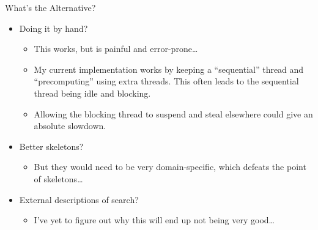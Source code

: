 \documentclass{beamer}
\begin{document}
\begin{frame}{What's the Alternative?}

    \begin{itemize}
        \item <2-> Doing it by hand?
            \begin{itemize}
                \item This works, but is painful and error-prone\ldots
                \item My current implementation works by keeping a ``sequential'' thread and
                    ``precomputing'' using extra threads. This often leads to the sequential thread
                    being idle and blocking.
                \item Allowing the blocking thread to suspend and steal elsewhere could give an
                    absolute slowdown.
            \end{itemize}

        \item <3-> Better skeletons?
            \begin{itemize}
                \item But they would need to be very domain-specific, which defeats the point of
                    skeletons\ldots
            \end{itemize}

        \item <4-> External descriptions of search?
            \begin{itemize}
                \item I've yet to figure out why this will end up not being very good\ldots
            \end{itemize}
    \end{itemize}

\end{frame}
\end{document}
